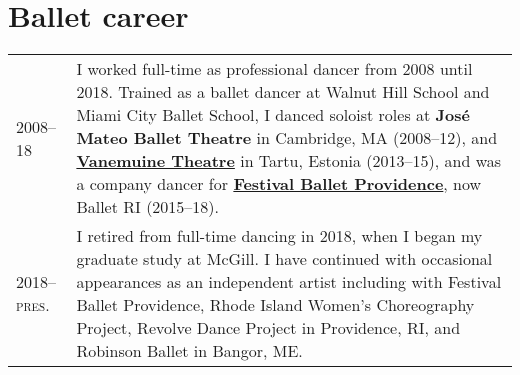 \documentclass[11pt,a4paper]{article}
\begin{document}
  \section{Ballet career}
  \begin{longtable}{p{1.7cm}|p{15cm}}
    \textsc{2008--18}
    &%
    I worked full-time as professional dancer from 2008 until 2018. Trained as a
    ballet dancer at Walnut Hill School and Miami City Ballet School, I danced
    soloist roles at \textbf{José Mateo Ballet Theatre} in Cambridge, MA
    (2008--12), and \href{http://vanemuine.ee}{\textbf{Vanemuine Theatre}} in
    Tartu, Estonia (2013--15), and was a company dancer for
    \href{http://festivalballetprovidence.org}{\textbf{Festival Ballet
    Providence}}, now Ballet RI (2015--18).\\
    \textsc{2018--pres.}
    &%
    I retired from full-time dancing in 2018, when I began my graduate study at
    McGill. I have continued with occasional appearances as an independent
    artist including with Festival Ballet Providence,  Rhode Island Women's
    Choreography Project,  Revolve Dance Project in Providence, RI,
    and Robinson Ballet in Bangor, ME.\\
  \end{longtable}

  
\end{document}
